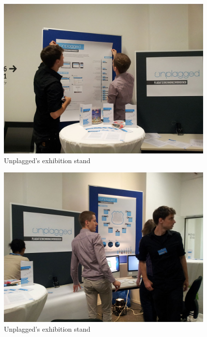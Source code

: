 \begin{figure}[!h]
  \centering
    \includegraphics[width=0.97\textwidth]{images/unplagged_exhibition_stand1.jpg}
  \caption{Unplagged's exhibition stand}
  \label{fig:unplagged_exhibition_stand1}
\end{figure}

\begin{figure}[!h]
  \centering
    \includegraphics[width=0.97\textwidth]{images/unplagged_exhibition_stand2.jpg}
  \caption{Unplagged's exhibition stand}
  \label{fig:unplagged_exhibition_stand2}
\end{figure}


